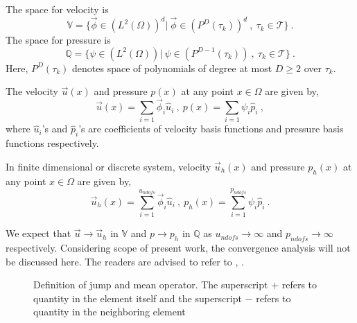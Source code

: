 \documentclass[graybox]{svmult}
\begin{document}
The space for velocity is 
\begin{equation} \label{velocity_test}
\mathbb{V} = \lbrace \overrightarrow{\phi} \in (L^2(\Omega))^d | \ \overrightarrow{\phi} \in (P^D(\tau_k))^d \ , \ \tau_k \in \mathcal{T} \rbrace \ .
\end{equation}
The space for pressure is 
\begin{equation} \label{pressure_test}
\mathbb{Q} = \lbrace \psi \in (L^2(\Omega)) | \ \psi \in (P^{D-1}(\tau_k)) \ , \ \tau_k \in \mathcal{T} \rbrace \ .
\end{equation}
Here, $P^D(\tau_k)$ denotes space of polynomials of degree at most $D \geq 2$ over $\tau_k$.

The velocity $\overrightarrow{u}(x)$ and pressure $p(x)$ at any point $x \in \Omega$ are given by,
\begin{equation}
\overrightarrow{u}(x) = \sum\limits_{i=1} \overrightarrow{\phi}_i \hat{u}_i \ , \
p(x) = \sum\limits_{i=1} \psi_i \hat{p}_i \ ,
\end{equation}
where $\hat{u}_i$'s and $\hat{p}_i$'s are coefficients of velocity basis functions and pressure basis functions respectively. 

In finite dimensional or discrete system, velocity $\overrightarrow{u}_h(x)$ and pressure $p_h(x)$ at any point $x \in \Omega$ are given by,
\begin{equation}\label{velocity_pressure_coefficients}
\overrightarrow{u}_h(x) = \sum\limits_{i=1}^{u_{ndofs}} \overrightarrow{\phi}_i \hat{u}_i \ , \
p_h(x) = \sum\limits_{i=1}^{p_{ndofs}} \psi_i \hat{p}_i \ .
\end{equation}

We expect that $\overrightarrow{u} \rightarrow \overrightarrow{u}_h$ in $\mathbb{V}$ and $p \rightarrow p_h$ in $\mathbb{Q}$ as $u_{ndofs} \rightarrow \infty$ and $p_{ndofs} \rightarrow \infty$ respectively. Considering scope of present work, the convergence analysis will not be discussed here. The readers are advised to refer to \cite{pacciarini}, \cite{riviere}. 

\begin{figure}
\centering
\sidecaption[t]
\caption{Definition of jump and mean operator. \newline The superscript $+$ refers to quantity in the element itself and the superscript $-$ refers to quantity in the neighboring element}
\label{fig:Self_neighbour}
\end{figure}
\end{document}
